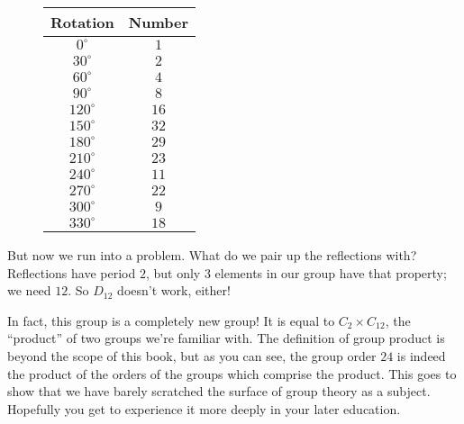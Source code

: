 \documentclass[../gatm.tex]{subfiles}
\begin{document}
\begin{figure}[h]
	\begin{center}
		\begin{minipage}[b]{\textwidth}
			\centering
			\begin{tabular}{cc}
				\hline
				Rotation & Number \\ \hline
				\rowcolor{light-gray}
				$0^\circ$ & $1$ \\
				$30^\circ$ & $2$ \\
				\rowcolor{light-gray}
				$60^\circ$ & $4$ \\
				$90^\circ$ & $8$ \\
				\rowcolor{light-gray}
				$120^\circ$ & $16$ \\
				$150^\circ$ & $32$ \\
				\rowcolor{light-gray}
				$180^\circ$ & $29$ \\
				$210^\circ$ & $23$ \\
				\rowcolor{light-gray}
				$240^\circ$ & $11$ \\
				$270^\circ$ & $22$ \\
				\rowcolor{light-gray}
				$300^\circ$ & $9$ \\
				$330^\circ$ & $18$ \\ \hline
			\end{tabular}
			\vspace*{0.5\baselineskip}
		\end{minipage}
	\end{center}
	\vspace*{-1\baselineskip}
\end{figure}


\noindent But now we run into a problem. What do we pair up the reflections with? Reflections have period $2$, but only $3$ elements in our group have that property; we need $12$. So $D_{12}$ doesn't work, either!

In fact, this group is a completely new group! It is equal to $C_2\times C_{12}$, the ``product'' of two groups we're familiar with. The definition of group product is beyond the scope of this book, but as you can see, the group order $24$ is indeed the product of the orders of the groups which comprise the product. This goes to show that we have barely scratched the surface of group theory as a subject. Hopefully you get to experience it more deeply in your later education.
\end{document}
